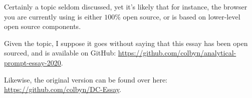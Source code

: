 Certainly a topic seldom discussed, yet it's likely that for instance, the browser you are currently using is either $100\%$ open source, or is based on lower-level open source components.


\begin{center}
Given the topic, I suppose it goes without saying that this essay has been open sourced, and is available on GitHub:
\url{https://github.com/colbyn/analytical-prompt-essay-2020}.

Likewise, the original version can be found over here: \url{https://github.com/colbyn/DC-Essay}.
\end{center}






